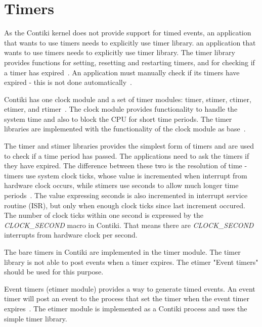 
\section{Timers}\label{sec:contiki-timers}
As the Contiki kernel does not provide support for timed events,
an application that wants to use timers needs to explicitly use timer library.
an application that wants to use timers needs to explicitly use timer library.
The timer library provides functions for setting, resetting and restarting timers,
and for checking if a timer has expired~\cite{contiki-docs}.
An application must manually check if its timers have expired - this is not done automatically~\cite{contiki-docs}.

Contiki has one clock module and a set of timer modules: timer, stimer, ctimer, etimer, and rtimer~\cite{contiki-wiki-timers}.
The clock module provides functionality to handle the system time and also to block the CPU for short time periods.
The timer libraries are implemented with the functionality of the clock module as base~\cite{contiki-wiki-timers}.

The timer and stimer libraries provides the simplest form of timers and are used to check if a time period has passed.
The applications need to ask the timers if they have expired.
The difference between these two is the resolution of time -
timers use system clock ticks, whose value is incremented when interrupt from hardware clock occurs,
while stimers use seconds to allow much longer time periods~\cite{contiki-wiki-timers}.
The value expressing seconds is also incremented in interrupt service routine (ISR),
but only when enough clock ticks since last increment occured.
The number of clock ticks within one second is expressed by the {\it{CLOCK\_SECOND}} macro in Contiki.
That means there are {\it{CLOCK\_SECOND}} interrupts from hardware clock per second.

The bare timers in Contiki are implemented in the timer module.
The timer library is not able to post events when a timer
expires. The etimer "Event timers" should be used for this
purpose.


Event timers (etimer module) provides a way to generate timed events.
An event timer will post an event to the process that set the timer when the
event timer expires~\cite{contiki-docs}.
The etimer module is implemented as a Contiki process and uses the simple timer library.

